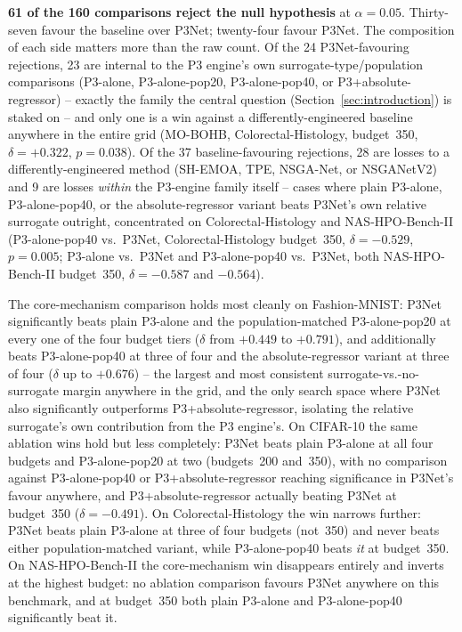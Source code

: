 \textbf{61 of the 160 comparisons reject the null hypothesis} at $\alpha=0.05$. Thirty-seven favour the
baseline over P3Net; twenty-four favour P3Net. The composition of each side matters more than the raw count.
Of the 24 P3Net-favouring rejections, 23 are internal to the P3 engine's own surrogate-type/population
comparisons (P3-alone, P3-alone-pop20, P3-alone-pop40, or P3+absolute-regressor) -- exactly the family the
central question (Section~\ref{sec:introduction}) is staked on -- and only one is a win against a
differently-engineered baseline anywhere in the entire grid (MO-BOHB, Colorectal-Histology, budget~350,
$\delta=+0.322$, $p=0.038$). Of the 37 baseline-favouring rejections, 28 are losses to a differently-engineered
method (SH-EMOA, TPE, NSGA-Net, or NSGANetV2) and 9 are losses \emph{within} the P3-engine family itself --
cases where plain P3-alone, P3-alone-pop40, or the absolute-regressor variant beats P3Net's own relative
surrogate outright, concentrated on Colorectal-Histology and NAS-HPO-Bench-II (P3-alone-pop40 vs.\ P3Net,
Colorectal-Histology budget~350, $\delta=-0.529$, $p=0.005$; P3-alone vs.\ P3Net and P3-alone-pop40 vs.\
P3Net, both NAS-HPO-Bench-II budget~350, $\delta=-0.587$ and $-0.564$).

The core-mechanism comparison holds most cleanly on Fashion-MNIST: P3Net significantly beats plain P3-alone
and the population-matched P3-alone-pop20 at every one of the four budget tiers ($\delta$ from $+0.449$ to
$+0.791$), and additionally beats P3-alone-pop40 at three of four and the absolute-regressor variant at
three of four ($\delta$ up to $+0.676$) -- the largest and most consistent surrogate-vs.-no-surrogate margin
anywhere in the grid, and the only search space where P3Net also significantly outperforms
P3+absolute-regressor, isolating the relative surrogate's own contribution from the P3 engine's. On CIFAR-10
the same ablation wins hold but less completely: P3Net beats plain P3-alone at all four budgets and
P3-alone-pop20 at two (budgets~200 and~350), with no comparison against P3-alone-pop40 or
P3+absolute-regressor reaching significance in P3Net's favour anywhere, and P3+absolute-regressor actually
beating P3Net at budget~350 ($\delta=-0.491$). On Colorectal-Histology the win narrows further: P3Net beats
plain P3-alone at three of four budgets (not~350) and never beats either population-matched variant, while
P3-alone-pop40 beats \emph{it} at budget~350. On NAS-HPO-Bench-II the core-mechanism win disappears
entirely and inverts at the highest budget: no ablation comparison favours P3Net anywhere on this benchmark,
and at budget~350 both plain P3-alone and P3-alone-pop40 significantly beat it.

